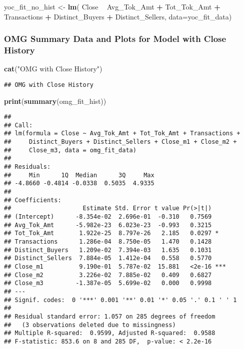 \documentclass[]{article}
\newenvironment{Shaded}{\begin{snugshade}}{\end{snugshade}}
\newcommand{\KeywordTok}[1]{\textcolor[rgb]{0.13,0.29,0.53}{\textbf{#1}}}
\newcommand{\DataTypeTok}[1]{\textcolor[rgb]{0.13,0.29,0.53}{#1}}
\newcommand{\StringTok}[1]{\textcolor[rgb]{0.31,0.60,0.02}{#1}}
\newcommand{\OperatorTok}[1]{\textcolor[rgb]{0.81,0.36,0.00}{\textbf{#1}}}
\newcommand{\NormalTok}[1]{#1}
\begin{document}
\begin{Shaded}
\begin{Highlighting}[]
\NormalTok{yoc_fit_no_hist <-}\StringTok{ }\KeywordTok{lm}\NormalTok{(}
\NormalTok{  Close }\OperatorTok{~}\StringTok{ }\NormalTok{Avg_Tok_Amt }\OperatorTok{+}
\StringTok{    }\NormalTok{Tot_Tok_Amt }\OperatorTok{+}
\StringTok{    }\NormalTok{Transactions }\OperatorTok{+}
\StringTok{    }\NormalTok{Distinct_Buyers }\OperatorTok{+}
\StringTok{    }\NormalTok{Distinct_Sellers,}
  \DataTypeTok{data=}\NormalTok{yoc_fit_data)}
\end{Highlighting}
\end{Shaded}

\subsubsection{OMG Summary Data and Plots for Model with Close
History}\label{omg-summary-data-and-plots-for-model-with-close-history}

\begin{Shaded}
\begin{Highlighting}[]
\KeywordTok{cat}\NormalTok{(}\StringTok{"OMG with Close History"}\NormalTok{)}
\end{Highlighting}
\end{Shaded}

\begin{verbatim}
## OMG with Close History
\end{verbatim}

\begin{Shaded}
\begin{Highlighting}[]
\KeywordTok{print}\NormalTok{(}\KeywordTok{summary}\NormalTok{(omg_fit_hist))}
\end{Highlighting}
\end{Shaded}

\begin{verbatim}
## 
## Call:
## lm(formula = Close ~ Avg_Tok_Amt + Tot_Tok_Amt + Transactions + 
##     Distinct_Buyers + Distinct_Sellers + Close_m1 + Close_m2 + 
##     Close_m3, data = omg_fit_data)
## 
## Residuals:
##     Min      1Q  Median      3Q     Max 
## -4.8660 -0.4814 -0.0338  0.5035  4.9335 
## 
## Coefficients:
##                    Estimate Std. Error t value Pr(>|t|)    
## (Intercept)      -8.354e-02  2.696e-01  -0.310   0.7569    
## Avg_Tok_Amt      -5.982e-23  6.023e-23  -0.993   0.3215    
## Tot_Tok_Amt       1.922e-25  8.797e-26   2.185   0.0297 *  
## Transactions      1.286e-04  8.750e-05   1.470   0.1428    
## Distinct_Buyers   1.209e-02  7.394e-03   1.635   0.1031    
## Distinct_Sellers  7.884e-05  1.412e-04   0.558   0.5770    
## Close_m1          9.190e-01  5.787e-02  15.881   <2e-16 ***
## Close_m2          3.226e-02  7.885e-02   0.409   0.6827    
## Close_m3         -1.387e-05  5.699e-02   0.000   0.9998    
## ---
## Signif. codes:  0 '***' 0.001 '**' 0.01 '*' 0.05 '.' 0.1 ' ' 1
## 
## Residual standard error: 1.057 on 285 degrees of freedom
##   (3 observations deleted due to missingness)
## Multiple R-squared:  0.9599, Adjusted R-squared:  0.9588 
## F-statistic: 853.6 on 8 and 285 DF,  p-value: < 2.2e-16
\end{verbatim}
\end{document}

